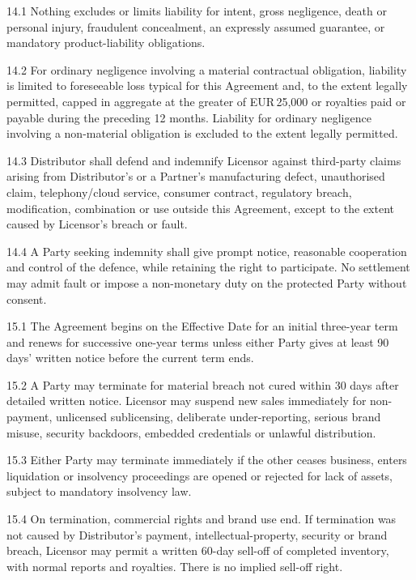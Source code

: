 \documentclass[11pt,a4paper]{article}
\newcommand{\money}{EUR\,}
\newcommand{\articleheading}[2]{%
  \par\medskip{\large\bfseries\color{voiderblue}#1\quad #2}\par\smallskip
}
\begin{document}
14.1 Nothing excludes or limits liability for intent, gross negligence, death or personal injury, fraudulent concealment, an expressly assumed guarantee, or mandatory product-liability obligations.

14.2 For ordinary negligence involving a material contractual obligation, liability is limited to foreseeable loss typical for this Agreement and, to the extent legally permitted, capped in aggregate at the greater of \money25,000 or royalties paid or payable during the preceding 12 months. Liability for ordinary negligence involving a non-material obligation is excluded to the extent legally permitted.

14.3 Distributor shall defend and indemnify Licensor against third-party claims arising from Distributor's or a Partner's manufacturing defect, unauthorised claim, telephony/cloud service, consumer contract, regulatory breach, modification, combination or use outside this Agreement, except to the extent caused by Licensor's breach or fault.

14.4 A Party seeking indemnity shall give prompt notice, reasonable cooperation and control of the defence, while retaining the right to participate. No settlement may admit fault or impose a non-monetary duty on the protected Party without consent.

\articleheading{15.}{Term and termination}

15.1 The Agreement begins on the Effective Date for an initial three-year term and renews for successive one-year terms unless either Party gives at least 90 days' written notice before the current term ends.

15.2 A Party may terminate for material breach not cured within 30 days after detailed written notice. Licensor may suspend new sales immediately for non-payment, unlicensed sublicensing, deliberate under-reporting, serious brand misuse, security backdoors, embedded credentials or unlawful distribution.

15.3 Either Party may terminate immediately if the other ceases business, enters liquidation or insolvency proceedings are opened or rejected for lack of assets, subject to mandatory insolvency law.

15.4 On termination, commercial rights and brand use end. If termination was not caused by Distributor's payment, intellectual-property, security or brand breach, Licensor may permit a written 60-day sell-off of completed inventory, with normal reports and royalties. There is no implied sell-off right.
\end{document}
